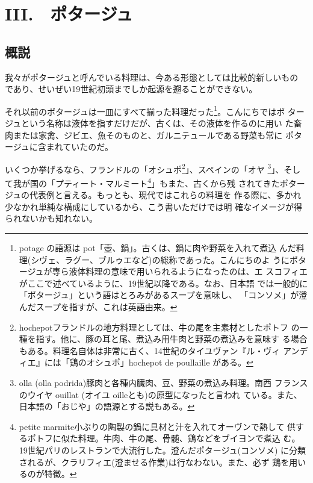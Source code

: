 \href{原稿下準備20180414五島、連載からコピー}{} \href{訳と注釈}{}
\href{未、原文対照チェック}{} \href{未、日本語表現校正}{}
\href{未、その他修正}{} \href{未、原稿最終校正}{}

\hypertarget{potages}{%
\chapter{III.　ポタージュ}\label{potages}}

\hypertarget{considerations-generales-potages}{%
\section{概説}\label{considerations-generales-potages}}


我々がポタージュと呼んでいる料理は、今ある形態としては比較的新しいもの
であり、せいぜい19世紀初頭までしか起源を遡ることができない。

それ以前のポタージュは一皿にすべて揃った料理だった\footnote{potage
  の語源は pot「壺、鍋」。古くは、鍋に肉や野菜を入れて煮込
  んだ料理(シヴェ、ラグー、ブルゥエなど)の総称であった。こんにちのよ
  うにポタージュが専ら液体料理の意味で用いられるようになったのは、エ
  スコフィエがここで述べているように、19世紀以降である。なお、日本語
  では一般的に「ポタージュ」という語はとろみがあるスープを意味し、
  「コンソメ」が澄んだスープを指すが、これは英語由来。}。こんにちではポ
タージュという名称は液体を指すだけだが、古くは、その液体を作るのに用い
た畜肉または家禽、ジビエ、魚そのものと、ガルニテュールである野菜も常に
ポタージュに含まれていたのだ。

いくつか挙げるなら、フランドルの「オシュポ\footnote{hochepotフランドルの地方料理としては、牛の尾を主素材としたポトフ
  の一種を指す。他に、豚の耳と尾、煮込み用牛肉と野菜の煮込みを意味す
  る場合もある。料理名自体は非常に古く、14世紀のタイユヴァン『ル・ヴィ
  アンディエ』には「鶏のオシュポ」hochepot de poullaille がある。}」、スペインの「オヤ
\footnote{olla (olla
  podrida)豚肉と各種内臓肉、豆、野菜の煮込み料理。南西 フランスのウイヤ
  ouillat (オイユ oilleとも)の原型になったと言われ
  ている。また、日本語の「おじや」の語源とする説もある。}」、そして我が国の「プティート・マルミート\footnote{petite
  marmite小ぶりの陶製の鍋に具材と汁を入れてオーヴンで熱して
  供するポトフに似た料理。牛肉、牛の尾、骨髄、鶏などをブイヨンで煮込
  む。19世紀パリのレストランで大流行した。澄んだポタージュ(コンソメ)
  に分類されるが、クラリフィエ(澄ませる作業)は行なわない。また、必ず
  鶏を用いるのが特徴。}」もまた、古くから残
されてきたポタージュの代表例と言える。もっとも、現代ではこれらの料理を
作る際に、多かれ少なかれ単純な構成にしているから、こう書いただけでは明
確なイメージが得られないかも知れない。

